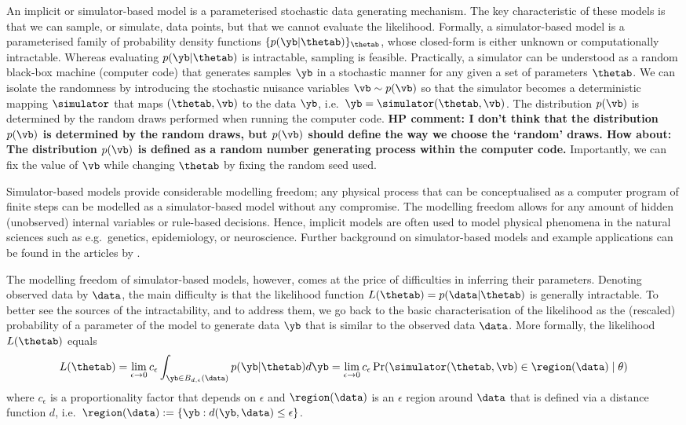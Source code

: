 An implicit or simulator-based model is a parameterised stochastic
data generating mechanism. The key characteristic of these models is
that we can sample, or simulate, data points, but that we cannot
evaluate the likelihood. Formally, a simulator-based model is a
parameterised family of probability density functions $\{
p(\yb|\thetab) \}_{\thetab}$, whose closed-form is either unknown or
computationally intractable. Whereas evaluating $p(\yb|\thetab)$ is
intractable, sampling is feasible. Practically, a simulator can be
understood as a random black-box machine (computer code) that
generates samples $\yb$ in a stochastic manner for any given a set of
parameters $\thetab$. We can isolate the randomness by introducing the
stochastic nuisance variables $\vb \sim p(\vb)$ so that the simulator
becomes a deterministic mapping $\simulator$ that maps
$(\thetab, \vb)$ to the data $\yb$, i.e.\
$\yb=\simulator(\thetab,\vb)$. The distribution $p(\vb)$ is determined
by the random draws performed when running the computer
code. \textbf{HP comment: I don't think that the
distribution $p(\vb)$ is determined by the random draws, but $p(\vb)$ 
should define the way we choose the `random' draws. How about: The distribution 
$p(\vb)$ is defined as a random number generating process within the computer 
code.} Importantly, we can fix the value of $\vb$ while changing
$\thetab$ by fixing the random seed used.

Simulator-based models provide considerable modelling freedom; any
physical process that can be conceptualised as a computer program of
finite steps can be modelled as a simulator-based model without any
compromise. The modelling freedom allows for any amount of hidden
(unobserved) internal variables or rule-based decisions. Hence,
implicit models are often used to model physical phenomena in the
natural sciences such as e.g.~genetics, epidemiology, or neuroscience. 
Further background on simulator-based models and
example applications can be found in the articles
by \citet{Gutmann2016, Lintusaari2017, Sisson2018, Cranmer2020}.


The modelling freedom of simulator-based models, however, comes at the
price of difficulties in inferring their parameters. Denoting observed
data by $\data$, the main difficulty is that the likelihood function
$L(\thetab) = p(\data|\thetab)$ is generally intractable. To better see the
sources of the intractability, and to address them, we go back to the
basic characterisation of the likelihood as the (rescaled) probability
of a parameter of the model to generate data $\yb$ that is similar to
the observed data $\data$. More formally, the likelihood $L(\thetab)$
equals
\begin{equation} \label{eq:likelihood}
  L(\thetab) = \lim_{\epsilon \to 0} c_\epsilon \int_{\yb \in B_{d,\epsilon}(\data)} p(\yb|\thetab)d\yb =
  \lim_{\epsilon \to 0} c_\epsilon \Pr(\simulator(\thetab, \vb) \in \region(\data)  \mid \theta)
\end{equation}
where $c_\epsilon$ is a proportionality factor that depends on
$\epsilon$ and $\region(\data)$ is an $\epsilon$ region around $\data$
that is defined via a distance function $d$, i.e.\ $\region(\data)
:= \{\yb: d(\yb, \data) \leq \epsilon \}$. 


